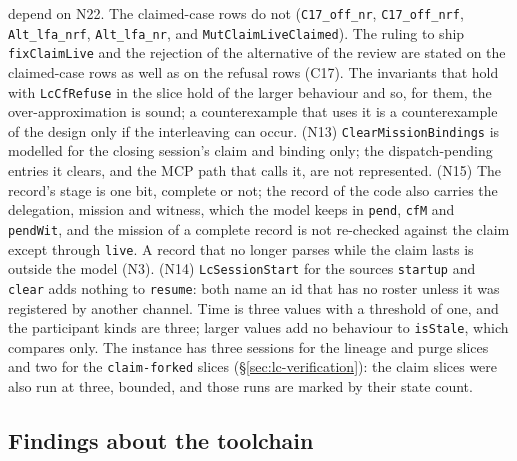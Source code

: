 \documentclass[a4paper,10pt,fleqn]{article}
\newcommand{\field}[1]{\texttt{#1}}
\begin{document}
depend on N22. The claimed-case rows do not (\texttt{C17\_off\_nr},
\texttt{C17\_off\_nrf}, \texttt{Alt\_lfa\_nrf}, \texttt{Alt\_lfa\_nr}, and
\texttt{MutClaimLiveClaimed}). The ruling to ship \field{fixClaimLive} and the
rejection of the alternative of the review are stated on the claimed-case
rows as well as on the refusal rows (C17). The invariants that hold with \field{LcCfRefuse} in the
slice hold of the larger behaviour and so, for them, the over-approximation
is sound; a counterexample that uses it is a counterexample of the design only
if the interleaving can occur.
(N13) \field{ClearMissionBindings} is modelled for the closing session's
claim and binding only; the dispatch-pending entries it clears, and the MCP
path that calls it, are not represented. (N15) The record's stage is one bit, complete or not; the record
of the code also carries the delegation, mission and witness, which the model
keeps in \field{pend}, \field{cfM} and \field{pendWit}, and the mission of a
complete record is not re-checked against the claim except through
\field{live}. A record that no longer parses while the claim lasts is outside
the model (N3). (N14) \field{LcSessionStart} for
the sources \field{startup} and \field{clear} adds nothing to
\field{resume}: both name an id that has no roster unless it was registered
by another channel. Time is three values with a threshold of one, and the
participant kinds are three; larger values add no behaviour to
\field{isStale}, which compares only. The instance has three sessions for
the lineage and purge slices and two for the \field{claim-forked} slices
(\S\ref{sec:lc-verification}): the claim slices were also run at three,
bounded, and those runs are marked by their state count.

\subsection{Findings about the toolchain}
\label{sec:lc-findings}
\end{document}
